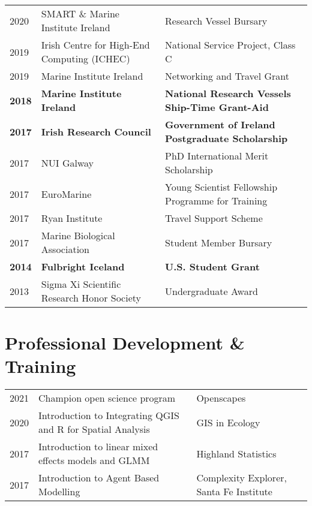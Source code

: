 \documentclass[a4paper]{deedy-resume} %
\begin{document}
\begin{flushleft}
\begin{tabular}{ l l l }
2020 & SMART \& Marine Institute Ireland & Research Vessel Bursary \\
2019 & Irish Centre for High-End Computing (ICHEC) & National Service Project, Class C \\
2019 & Marine Institute Ireland & Networking and Travel Grant \\
\textbf{2018} & \textbf{Marine Institute Ireland} & \textbf{National Research Vessels Ship-Time Grant-Aid} \\
\textbf{2017} & \textbf{Irish Research Council} & \textbf{Government of Ireland Postgraduate Scholarship} \\
2017 & NUI Galway & PhD International Merit Scholarship \\
2017 & EuroMarine & Young Scientist Fellowship Programme for Training \\
2017 & Ryan Institute & Travel Support Scheme \\
2017 & Marine Biological Association & Student Member Bursary \\
\textbf{2014} & \textbf{Fulbright Iceland} & \textbf{U.S. Student Grant} \\
2013 & Sigma Xi Scientific Research Honor Society & Undergraduate Award

\end{tabular}

\sectionspace %


\sectionspace %

\section{Professional Development \& Training}

\begin{tabular}{ l l l }
2021 & Champion open science program & Openscapes \\
2020 & Introduction to Integrating QGIS and R for Spatial Analysis & GIS in Ecology \\
2017 & Introduction to linear mixed effects models and GLMM & Highland Statistics \\
2017 & Introduction to Agent Based Modelling & Complexity Explorer, Santa Fe Institute \\

\end{tabular}


\end{flushleft}
\end{document}
